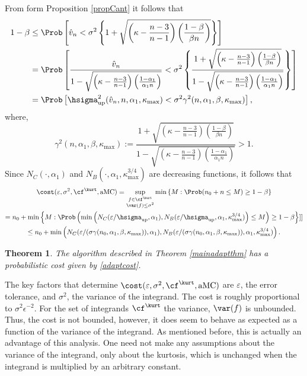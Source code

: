\documentclass[12pt]{amsart}
\newcommand{\hv}{\hat{v}}
\newtheorem{theorem}{Theorem}
\DeclareMathOperator{\aMC}{aMC}
\begin{document}
From form Proposition \ref{propCant} it follows that
\begin{align*}
1-\beta & \le \Prob\left[\hv_n < \sigma^2 \left\{1 + \sqrt{\left ( \kappa  - \frac{n-3}{n-1}\right)\left(\frac{1-\beta}{\beta n}\right)}\right\} \right] \\
& = \Prob\left[\frac{\hv_n} {1 - \sqrt{\left ( \kappa  - \frac{n-3}{n-1}\right)\left(\frac{1-\alpha_1}{\alpha_1 n}\right)}} < \sigma^2 \left\{\frac{1 + \sqrt{\left ( \kappa  - \frac{n-3}{n-1}\right)\left(\frac{1-\beta}{\beta n}\right)}} {1 - \sqrt{\left ( \kappa  - \frac{n-3}{n-1}\right)\left(\frac{1-\alpha_1}{\alpha_1 n}\right)}} \right\} \right] \\
& = \Prob\left[\hsigma^2_{\text{\rm up}}(\hv_{n},n,\alpha_1,\kappa_{\max}) < \sigma^2 \gamma^2(n,\alpha_1,\beta,\kappa_{\max}) \right],
\end{align*}
where,
\[
\gamma^2(n,\alpha_1,\beta,\kappa_{\max}) := \frac{1 + \sqrt{\left ( \kappa  - \frac{n-3}{n-1}\right)\left(\frac{1-\beta}{\beta n}\right)}} {1 - \sqrt{\left ( \kappa  - \frac{n-3}{n-1}\right)\left(\frac{1-\alpha_1}{\alpha_1 n}\right)}} > 1.
\]
Since $N_C(\cdot,\alpha_1)$ and $N_B(\cdot,\alpha_1,\kappa_{\max}^{3/4})$ are decreasing functions, it follows that
\begin{multline} \label{adaptcost}
\cost(\varepsilon,\sigma^2,\cf^{\kurt},\aMC) = \sup_{\substack{f \in \cf^{\kurt}\\ \var(f)\le \sigma^2} } \min\left\{M : \Prob(n_0 + n \le M) \ge 1-\beta  \right \}\\
= n_0 + \min\left\{M : \Prob\left( \min\left( N_C(\varepsilon/\hsigma_{\text{\rm up}},\alpha_1), N_B(\varepsilon/\hsigma_{\text{\rm up}},\alpha_1,\kappa_{\max}^{3/4}) \right) \le M\right) \ge 1-\beta  \right \}]] \\
\le n_0 + \min\left( N_C(\varepsilon/(\sigma\gamma(n_0,\alpha_1,\beta,\kappa_{\max})),\alpha_1), N_B(\varepsilon/(\sigma\gamma(n_0,\alpha_1,\beta,\kappa_{\max})),\alpha_1,\kappa_{\max}^{3/4}) \right).
\end{multline}

\begin{theorem} \label{costtheorem} The algorithm described in Theorem \ref{mainadaptthm} has a probabilistic cost given by \eqref{adaptcost}.
\end{theorem}

The key factors that determine $\cost(\varepsilon,\sigma^2,\cf^{\kurt},\aMC)$ are $\varepsilon$, the error tolerance, and $\sigma^2$, the variance of the integrand.  The cost is roughly proportional to $\sigma^2\epsilon^{-2}$.  For the set of integrands $\cf^{\kurt}$ the variance, $\var(f)$ is unbounded.  Thus, the cost is not bounded, however, it does seem to behave as expected as a function of the variance of the integrand.  As mentioned before, this is actually an advantage of this analysis.  One need not make any assumptions about the variance of the integrand, only about the kurtosis, which is unchanged when the integrand is multiplied by an arbitrary constant.
\end{document}

